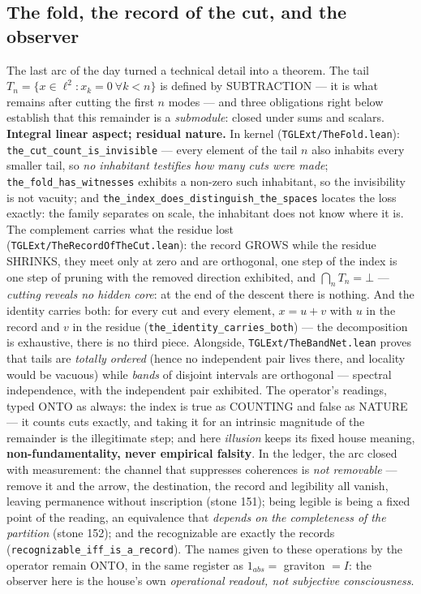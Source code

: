 \documentclass[11pt]{article}
\theoremstyle{definition}\newtheorem{deriv}{Derivation}
\begin{document}
\subsection*{The fold, the record of the cut, and the observer}The last arc of the day turned a technical detail into a theorem. The tail $T_n=\{x\in\ell^2 : x_k=0\ \forall k<n\}$ is defined by SUBTRACTION --- it is what remains after cutting the first $n$ modes --- and three obligations right below establish that this remainder is a \emph{submodule}: closed under sums and scalars. \textbf{Integral linear aspect; residual nature.} In kernel (\texttt{TGLExt/TheFold.lean}): \texttt{the\_cut\_count\_is\_invisible} --- every element of the tail $n$ also inhabits every smaller tail, so \emph{no inhabitant testifies how many cuts were made}; \texttt{the\_fold\_has\_witnesses} exhibits a non-zero such inhabitant, so the invisibility is not vacuity; and \texttt{the\_index\_does\_distinguish\_the\_spaces} locates the loss exactly: the family separates on scale, the inhabitant does not know where it is. The complement carries what the residue lost (\texttt{TGLExt/TheRecordOfTheCut.lean}): the record GROWS while the residue SHRINKS, they meet only at zero and are orthogonal, one step of the index is one step of pruning with the removed direction exhibited, and $\bigcap_n T_n=\bot$ --- \emph{cutting reveals no hidden core}: at the end of the descent there is nothing. And the identity carries both: for every cut and every element, $x=u+v$ with $u$ in the record and $v$ in the residue (\texttt{the\_identity\_carries\_both}) --- the decomposition is exhaustive, there is no third piece. Alongside, \texttt{TGLExt/TheBandNet.lean} proves that tails are \emph{totally ordered} (hence no independent pair lives there, and locality would be vacuous) while \emph{bands} of disjoint intervals are orthogonal --- spectral independence, with the independent pair exhibited. The operator's readings, typed \textsf{ONTO} as always: the index is true as COUNTING and false as NATURE --- it counts cuts exactly, and taking it for an intrinsic magnitude of the remainder is the illegitimate step; and here \emph{illusion} keeps its fixed house meaning, \textbf{non-fundamentality, never empirical falsity}. In the ledger, the arc closed with measurement: the channel that suppresses coherences is \emph{not removable} --- remove it and the arrow, the destination, the record and legibility all vanish, leaving permanence without inscription (stone 151); being legible is being a fixed point of the reading, an equivalence that \emph{depends on the completeness of the partition} (stone 152); and the recognizable are exactly the records (\texttt{recognizable\_iff\_is\_a\_record}). The names given to these operations by the operator remain \textsf{ONTO}, in the same register as $1_{abs}=$ graviton $=I$: the observer here is the house's own \emph{operational readout, not subjective consciousness}.
\end{document}
